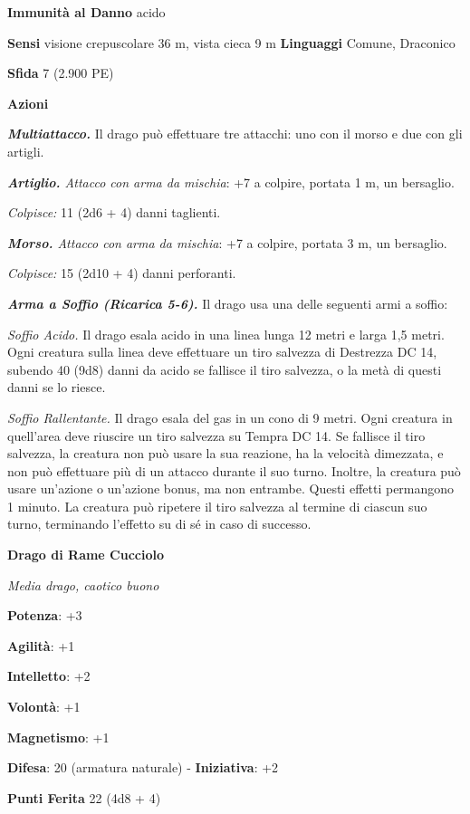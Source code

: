 \begin{multicols}{2}
\textbf{Immunità al Danno} acido

\textbf{Sensi} visione crepuscolare 36 m, vista cieca 9 m
\textbf{Linguaggi} Comune, Draconico

\textbf{Sfida} 7 (2.900 PE)\smallskip

\smallskip\textbf{Azioni}

\emph{\textbf{Multiattacco.}} Il drago può effettuare tre attacchi: uno
con il morso e due con gli artigli.

\emph{\textbf{Artiglio.} Attacco con arma da mischia}: +7 a colpire,
portata 1 m, un bersaglio.

\emph{Colpisce:} 11 (2d6 + 4) danni taglienti.

\emph{\textbf{Morso.} Attacco con arma da mischia}: +7 a colpire,
portata 3 m, un bersaglio.

\emph{Colpisce:} 15 (2d10 + 4) danni perforanti.

\emph{\textbf{Arma a Soffio (Ricarica 5-6).}} Il drago usa una delle
seguenti armi a soffio:

\emph{Soffio Acido.} Il drago esala acido in una linea lunga 12 metri e
larga 1,5 metri. Ogni creatura sulla linea deve effettuare un tiro
salvezza di Destrezza DC 14, subendo 40 (9d8) danni da acido se fallisce
il tiro salvezza, o la metà di questi danni se lo riesce.

\emph{Soffio Rallentante.} Il drago esala del gas in un cono di 9 metri.
Ogni creatura in quell'area deve riuscire un tiro salvezza su Tempra DC 14. Se fallisce il tiro salvezza, la creatura non può
usare la sua reazione, ha la velocità dimezzata, e non può effettuare
più di un attacco durante il suo turno. Inoltre, la creatura può usare
un'azione o un'azione bonus, ma non entrambe. Questi effetti permangono
1 minuto. La creatura può ripetere il tiro salvezza al termine di
ciascun suo turno, terminando l'effetto su di sé in caso di successo.

\textbf{Drago di Rame Cucciolo}

\emph{Media drago, caotico buono}

\textbf{Potenza}: +3

\textbf{Agilità}: +1

\textbf{Intelletto}: +2

\textbf{Volontà}: +1

\textbf{Magnetismo}: +1

\textbf{Difesa}: 20 (armatura naturale) - \textbf{Iniziativa}: +2

\textbf{Punti Ferita} 22 (4d8 + 4)


\end{multicols}
